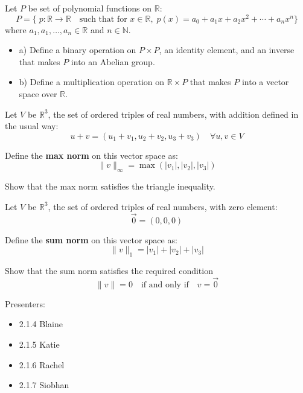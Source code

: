 \begin{problem*}
Let $P$ be set of polynomial functions on $\mathbb{R}$:  
\[
P=\{\;p:\mathbb{R}\rightarrow\mathbb{R}\quad\mbox{such that for } x\in\mathbb{R},\;p(x)=a_0+a_1x+a_2x^2+\cdots+a_nx^n\}
\]  
where $a_1,a_1,\ldots,a_n\in\mathbb{R}$ and $n\in\mathbb{N}$.
\end{problem*}
\par\vspace{0.3 cm}
\begin{itemize}  
\item a) Define a binary operation on $P\times P$, an identity element, and an inverse that makes $P$ into an Abelian group.
\item b) Define a multiplication operation on $\mathbb{R}\times P$ that makes $P$ into a vector space over $\mathbb{R}$.
\end{itemize}
\begin{problem*}
Let $V$ be $\mathbb{R}^3$, the set of ordered triples of real numbers, with addition defined in the usual way:   
\[
u+v = (u_1+v_1, u_2+v_2, u_3+v_3)\quad \forall u,v\in V
\]  
\par\vspace{0.3 cm} 
Define the \textbf{max norm} on this vector space as:
\[
\|v\|_{\infty} = \max(|v_1|,|v_2|,|v_3|)
\]
\par\vspace{0.3 cm}
Show that the max norm satisfies the triangle inequality.
\end{problem*}
\begin{problem*}
Let $V$ be $\mathbb{R}^3$, the set of ordered triples of real numbers, with zero element:   
\[
\vec{0} = (0,0,0)
\]  
\par\vspace{0.3 cm} 
Define the \textbf{sum norm} on this vector space as:
\[
\|v\|_1 = |v_1|+|v_2|+|v_3|
\]
\par\vspace{0.3 cm}
Show that the sum norm satisfies the required condition
\[
\|v\|=0\quad\mbox{if and only if}\quad v=\vec{0}
\]
\end{problem*}
Presenters:
\begin{itemize}
\item 2.1.4  Blaine
\item 2.1.5  Katie
\item 2.1.6  Rachel
\item 2.1.7 Siobhan
\end{itemize}


